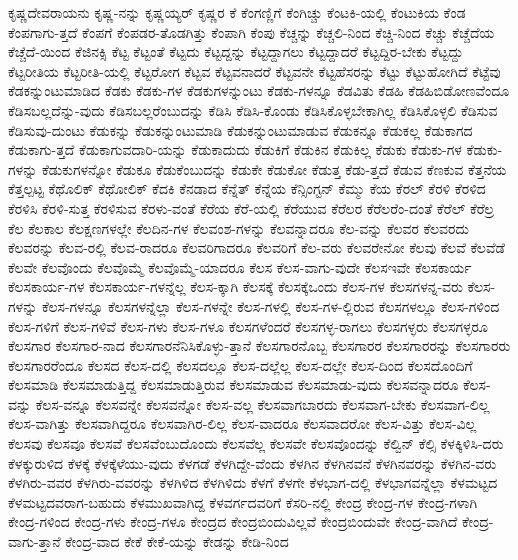 {ಕೃಷ್ಣದೇವರಾಯನು
ಕೃಷ್ಣ-ನನ್ನು
ಕೃಷ್ಣಯ್ಯರ್
ಕೃಷ್ಣರ
ಕೆ
ಕೆಂಗಣ್ಣಿಗೆ
ಕೆಂಗಿಚ್ಚು
ಕೆಂಟಕಿ-ಯಲ್ಲಿ
ಕೆಂಟುಕಿಯ
ಕೆಂಡ
ಕೆಂಪಗಾಗು-ತ್ತದೆ
ಕೆಂಪಗೆ
ಕೆಂಪಡರ-ತೊಡಗಿತ್ತು
ಕೆಂಪಾಗಿ
ಕೆಂಪು
ಕೆಚ್ಚನ್ನು
ಕೆಚ್ಚಲಿ-ನಿಂದ
ಕೆಚ್ಚಿ-ನಿಂದ
ಕೆಚ್ಚು
ಕೆಚ್ಚೆದೆಯ
ಕೆಚ್ಚೆದೆ-ಯಿಂದ
ಕೆಜಿನಕ್ಸಿ
ಕೆಟ್ಟ
ಕೆಟ್ಟಂತೆ
ಕೆಟ್ಟದು
ಕೆಟ್ಟದ್ದನ್ನು
ಕೆಟ್ಟದ್ದಾಗಲು
ಕೆಟ್ಟದ್ದಾದರೆ
ಕೆಟ್ಟದ್ದಿರ-ಬೇಕು
ಕೆಟ್ಟದ್ದು
ಕೆಟ್ಟರೀತಿಯ
ಕೆಟ್ಟರೀತಿ-ಯಲ್ಲಿ
ಕೆಟ್ಟರೋಗ
ಕೆಟ್ಟವ
ಕೆಟ್ಟವನಾದರೆ
ಕೆಟ್ಟವನೇ
ಕೆಟ್ಟಹೆಸರನ್ನು
ಕೆಟ್ಟು
ಕೆಟ್ಟುಹೋಗಿದೆ
ಕೆಟ್ಟೆವು
ಕೆಡಕನ್ನುಂಟುಮಾಡಿದ
ಕೆಡಕು
ಕೆಡಕು-ಗಳ
ಕೆಡಕುಗಳನ್ನುಂಟು
ಕೆಡಕು-ಗಳನ್ನೂ
ಕೆಡವಿತು
ಕೆಡಹಿ
ಕೆಡಹಿಬಿಡೋಣವೆಂದೂ
ಕೆಡಿಸಬಲ್ಲದೆನ್ನು-ವುದು
ಕೆಡಿಸಬಲ್ಲರೆಂಬುದನ್ನು
ಕೆಡಿಸಿ
ಕೆಡಿಸಿ-ಕೊಂಡು
ಕೆಡಿಸಿಕೊಳ್ಳಬೇಕಾಗಿಲ್ಲ
ಕೆಡಿಸಿಕೊಳ್ಳಲಿ
ಕೆಡಿಸುವ
ಕೆಡಿಸುವು-ದುಂಟು
ಕೆಡುಕನ್ನು
ಕೆಡುಕನ್ನುಂಟುಮಾಡಿ
ಕೆಡುಕನ್ನುಂಟುಮಾಡುವ
ಕೆಡುಕನ್ನೂ
ಕೆಡುಕಲ್ಲ
ಕೆಡುಕಾಗದ
ಕೆಡುಕಾಗು-ತ್ತದೆ
ಕೆಡುಕಾಗುವದಾರಿ-ಯನ್ನು
ಕೆಡುಕಾದುದು
ಕೆಡುಕಿಗೆ
ಕೆಡುಕಿನ
ಕೆಡುಕಿಲ್ಲ
ಕೆಡುಕು
ಕೆಡುಕು-ಗಳ
ಕೆಡುಕು-ಗಳನ್ನು
ಕೆಡುಕುಗಳನ್ನೋ
ಕೆಡುಕೂ
ಕೆಡುಕೆಂಬುದನ್ನು
ಕೆಡುಕೇ
ಕೆಡುಕೋ
ಕೆಡುತ್ತ
ಕೆಡು-ತ್ತದೆ
ಕೆಡುವ
ಕೆಣಕುವ
ಕೆತ್ತನೆಯ
ಕೆತ್ತಲ್ಪಟ್ಟ
ಕೆಥೊಲಿಕ್
ಕೆಥೋಲಿಕ್
ಕೆದಕಿ
ಕೆನಡಾದ
ಕೆನ್ನೆತ್
ಕೆನ್ನೆಯ
ಕೆನ್ಸಿಂಗ್ಟನ್
ಕೆಮ್ಮು
ಕೆಯ
ಕೆರಲ್
ಕೆರಳಿ
ಕೆರಳಿದ
ಕೆರಳಿಸಿ
ಕೆರಳಿ-ಸುತ್ತ
ಕೆರಳಿಸುವ
ಕೆರಳು-ವಂತೆ
ಕೆರೆಯ
ಕೆರೆ-ಯಲ್ಲಿ
ಕೆರೆಯುವ
ಕೆರೆಲರ
ಕೆರೆಲರೆಂ-ದಂತೆ
ಕೆರೆಲ್
ಕೆರೆಲ್ರ
ಕೆಲ
ಕೆಲಕಾಲ
ಕೆಲಕ್ಷಣಗಳಲ್ಲೇ
ಕೆಲದಿನ-ಗಳ
ಕೆಲವಂಶ-ಗಳನ್ನು
ಕೆಲವನ್ನಾದರೂ
ಕೆಲ-ವನ್ನು
ಕೆಲವರ
ಕೆಲವರದು
ಕೆಲವರನ್ನು
ಕೆಲವ-ರಲ್ಲಿ
ಕೆಲವ-ರಾದರೂ
ಕೆಲವರಿಗಾದರೂ
ಕೆಲವರಿಗೆ
ಕೆಲ-ವರು
ಕೆಲವರೇನೋ
ಕೆಲವು
ಕೆಲವೆ
ಕೆಲವೆಡೆ
ಕೆಲವೇ
ಕೆಲವೊಂದು
ಕೆಲವೊಮ್ಮೆ
ಕೆಲವೊಮ್ಮೆ-ಯಾದರೂ
ಕೆಲಸ
ಕೆಲಸ-ವಾಗು-ವುದೇ
ಕೆಲಸಇವೇ
ಕೆಲಸಕಾರ್ಯ
ಕೆಲಸಕಾರ್ಯ-ಗಳ
ಕೆಲಸಕಾರ್ಯ-ಗಳನ್ನೆಲ್ಲ
ಕೆಲಸ-ಕ್ಕಾಗಿ
ಕೆಲಸಕ್ಕೆ
ಕೆಲಸಕ್ಕೆಒಂದು
ಕೆಲಸ-ಗಳ
ಕೆಲಸಗಳನ್ನ-ವರು
ಕೆಲಸ-ಗಳನ್ನು
ಕೆಲಸ-ಗಳನ್ನೂ
ಕೆಲಸಗಳನ್ನೆಲ್ಲಾ
ಕೆಲಸ-ಗಳನ್ನೇ
ಕೆಲಸ-ಗಳಲ್ಲಿ
ಕೆಲಸ-ಗಳ-ಲ್ಲಿರುವ
ಕೆಲಸಗಳಲ್ಲೂ
ಕೆಲಸ-ಗಳಿಂದ
ಕೆಲಸ-ಗಳಿಗೆ
ಕೆಲಸ-ಗಳಿವೆ
ಕೆಲಸ-ಗಳು
ಕೆಲಸ-ಗಳೂ
ಕೆಲಸಗಳೆಂದರೆ
ಕೆಲಸಗಳ್ಳ-ರಾಗಲು
ಕೆಲಸಗಳ್ಳರು
ಕೆಲಸಗಳ್ಳರೂ
ಕೆಲಸಗಾರ
ಕೆಲಸಗಾರ-ನಾದ
ಕೆಲಸಗಾರನೆನಿಸಿಕೊಳ್ಳು-ತ್ತಾನೆ
ಕೆಲಸಗಾರನೊಬ್ಬ
ಕೆಲಸಗಾರರ
ಕೆಲಸಗಾರರನ್ನು
ಕೆಲಸಗಾರರು
ಕೆಲಸಗಾರರೆಂದೂ
ಕೆಲಸದ
ಕೆಲಸ-ದಲ್ಲಿ
ಕೆಲಸದಲ್ಲೂ
ಕೆಲಸ-ದಲ್ಲೆಲ್ಲ
ಕೆಲಸ-ದಲ್ಲೇ
ಕೆಲಸ-ದಿಂದ
ಕೆಲಸದೊಂದಿಗೆ
ಕೆಲಸಮಾಡಿ
ಕೆಲಸಮಾಡುತ್ತಿದ್ದ
ಕೆಲಸಮಾಡುತ್ತಿರುವ
ಕೆಲಸಮಾಡುವ
ಕೆಲಸಮಾಡು-ವುದು
ಕೆಲಸವನ್ನಾದರೂ
ಕೆಲಸ-ವನ್ನು
ಕೆಲಸ-ವನ್ನೂ
ಕೆಲಸವನ್ನೇ
ಕೆಲಸವನ್ನೋ
ಕೆಲಸ-ವಲ್ಲ
ಕೆಲಸವಾಗಬಾರದು
ಕೆಲಸವಾಗ-ಬೇಕು
ಕೆಲಸವಾಗ-ಲಿಲ್ಲ
ಕೆಲಸ-ವಾಗಿತ್ತು
ಕೆಲಸವಾಗಿದ್ದರೂ
ಕೆಲಸವಾಗಿರ-ಲಿಲ್ಲ
ಕೆಲಸ-ವಾದರೂ
ಕೆಲಸವಾದರೋ
ಕೆಲಸ-ವಿತ್ತು
ಕೆಲಸ-ವಿಲ್ಲ
ಕೆಲಸವು
ಕೆಲಸವೂ
ಕೆಲಸವೆ
ಕೆಲಸವೆಂಬುದೊಂದು
ಕೆಲಸವೆಲ್ಲ
ಕೆಲಸವೇ
ಕೆಲಸವೊಂದನ್ನು
ಕೆಲ್ವಿನ್
ಕೆಲ್ಸಿ
ಕೆಳಕ್ಕಿಳಿಸಿ-ದರು
ಕೆಳಕ್ಕುರುಳಿದ
ಕೆಳಕ್ಕೆ
ಕೆಳಕ್ಕೆಳೆಯು-ವುದು
ಕೆಳಗಡೆ
ಕೆಳಗಿದ್ದೇ-ವೆಂದು
ಕೆಳಗಿನ
ಕೆಳಗಿನವನೆ
ಕೆಳಗಿನವರನ್ನು
ಕೆಳಗಿನ-ವರು
ಕೆಳಗಿರು-ವವರ
ಕೆಳಗಿರು-ವವರನ್ನು
ಕೆಳಗಿಳಿದ
ಕೆಳಗಿಳಿದು
ಕೆಳಗೆ
ಕೆಳಗೇ
ಕೆಳಭಾಗ-ದಲ್ಲಿ
ಕೆಳಭಾಗವನ್ನೆಲ್ಲಾ
ಕೆಳಮಟ್ಟದ
ಕೆಳಮಟ್ಟದವರಾಗ-ಬಹುದು
ಕೆಳಮುಖವಾಗಿದ್ದ
ಕೆಳವರ್ಗದವರಿಗೆ
ಕೆಸರಿ-ನಲ್ಲಿ
ಕೇಂದ್ರ
ಕೇಂದ್ರ-ಗಳ
ಕೇಂದ್ರ-ಗಳಾಗಿ
ಕೇಂದ್ರ-ಗಳಿಂದ
ಕೇಂದ್ರ-ಗಳು
ಕೇಂದ್ರ-ಗಳೂ
ಕೇಂದ್ರದ
ಕೇಂದ್ರಬಿಂದುವಿಲ್ಲವೆ
ಕೇಂದ್ರಬಿಂದುವೇ
ಕೇಂದ್ರ-ವಾಗಿದೆ
ಕೇಂದ್ರ-ವಾಗು-ತ್ತಾನೆ
ಕೇಂದ್ರ-ವಾದ
ಕೇಕೆ
ಕೇಕೆ-ಯನ್ನು
ಕೇಡನ್ನು
ಕೇಡಿ-ನಿಂದ
}
